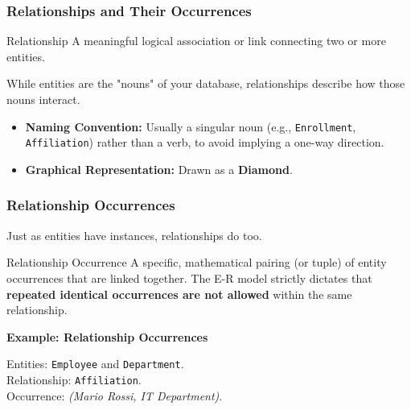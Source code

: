 \subsubsection{Relationships and Their Occurrences}

\begin{defbox}{Relationship}
A meaningful logical association or link connecting two or more entities.
\end{defbox}

While entities are the "nouns" of your database, relationships describe how those nouns interact.
\begin{itemize}
    \item \textbf{Naming Convention:} Usually a singular noun (e.g., \texttt{Enrollment}, \texttt{Affiliation}) rather than a verb, to avoid implying a one-way direction. 
    \item \textbf{Graphical Representation:} Drawn as a \textbf{Diamond}.
\end{itemize}

\subsubsection{Relationship Occurrences}
Just as entities have instances, relationships do too.

\begin{defbox}{Relationship Occurrence}
A specific, mathematical pairing (or tuple) of entity occurrences that are linked together. The E-R model strictly dictates that \textbf{repeated identical occurrences are not allowed} within the same relationship.
\end{defbox}

\vspace{0.2cm}
\begin{example}{\textbf{Example: Relationship Occurrences}}



\vspace{0.2cm}
Entities: \texttt{Employee} and \texttt{Department}.\\
Relationship: \texttt{Affiliation}.\\
Occurrence: \textit{(Mario Rossi, IT Department)}.

\vs

\begin{center}
\end{center}

\end{example}

